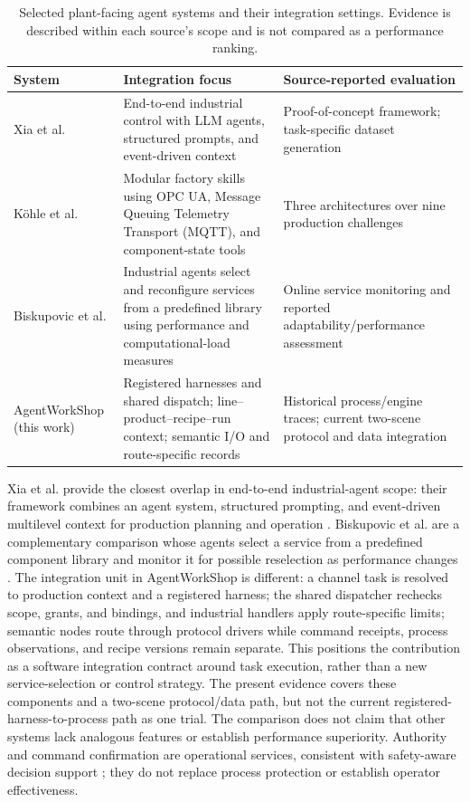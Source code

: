 \begin{table}[!t]
\centering
\caption{Selected plant-facing agent systems and their integration settings.
Evidence is described within each source's scope and is not compared as a
performance ranking.}
\label{tab:nearest}
\small
\setlength{\tabcolsep}{4pt}
\begin{tabularx}{\textwidth}{@{}p{2.2cm}XX@{}}
\toprule
System & Integration focus & Source-reported evaluation \\
\midrule
Xia et al. \cite{xia2025control} & End-to-end industrial control with LLM agents, structured prompts, and event-driven context & Proof-of-concept framework; task-specific dataset generation \\
K{\"o}hle et al. \cite{koehle2026llmdriven} & Modular factory skills using OPC UA, Message Queuing Telemetry Transport (MQTT), and component-state tools & Three architectures over nine production challenges \\
Biskupovic et al. \cite{biskupovic2025supervision} & Industrial agents select and reconfigure services from a predefined library using performance and computational-load measures & Online service monitoring and reported adaptability/performance assessment \\
\midrule
AgentWorkShop (this work) & Registered harnesses and shared dispatch; line--product--recipe--run context; semantic I/O and route-specific records & Historical process/engine traces; current two-scene protocol and data integration \\
\bottomrule
\end{tabularx}
\end{table}

Xia et al. provide the closest overlap in end-to-end industrial-agent scope:
their framework combines an agent system, structured prompting, and
event-driven multilevel context for production planning and operation
\cite{xia2025control}. Biskupovic et al. are a complementary comparison whose
agents select a service from a predefined component library and monitor it for
possible reselection as performance changes
\cite{biskupovic2025supervision}. The integration unit in AgentWorkShop is
different: a channel task is resolved to
production context and a registered harness; the shared dispatcher rechecks
scope, grants, and bindings, and industrial handlers apply route-specific
limits; semantic
nodes route through protocol drivers while command receipts, process
observations, and recipe versions remain separate. This positions the
contribution as a software integration contract around task execution, rather
than a new service-selection or control strategy. The present evidence covers
these components and a two-scene protocol/data path, but not the current
registered-harness-to-process path as one trial. The comparison does not
claim that other systems lack analogous features or establish performance
superiority. Authority and command confirmation are operational services,
consistent with safety-aware decision support \cite{jiang2026agentic}; they
do not replace process protection or establish operator effectiveness.

